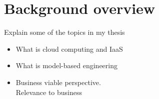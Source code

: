 \section{Background overview}

Explain some of the topics in my thesis

\begin{itemize}
  \item What is cloud computing and IaaS
  \item What is model-based engineering
  \item Business viable perspective. \\
    Relevance to business
\end{itemize}
